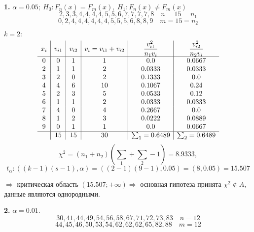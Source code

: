 \documentclass[9pt]{article}
\begin{document}
\ 
\par\textbf{1.} \(\alpha=0.05;\ H_0:F_n(x)=F_m(x),\ H_1:F_n(x)\neq F_m(x)\)
\[2,3,3,4,4,4,4,5,5,6,7,7,7,7,8\quad n=15=n_1\]
\[0,2,4,4,4,4,4,4,5,5,5,6,8,8,9\quad m=15=n_2\]
\par\(k=2:\)
\[\begin{array}{c|c|c|c|c|c}
    x_i & v_{i1} & v_{i2} & v_i=v_{i1}+v_{i2} & \dfrac{v_{i1}^2}{n_1v_i} & \dfrac{v_{i2}^2}{n_2v_i}\\
    \hline
    0 & 0 & 1 & 1 & 0.0 & 0.0667\\
    2 & 1 & 1 & 2 & 0.0333 & 0.0333\\
    3 & 2 & 0 & 2 & 0.1333 & 0.0 \\
    4 & 4 & 6 & 10 & 0.1067 & 0.24\\
    5 & 2 & 3 & 5 & 0.0533 & 0.12 \\
    6 & 1 & 1 & 2 & 0.0333 & 0.0333\\
    7 & 4 & 0 & 4 & 0.2667 & 0.0\\
    8 & 1 & 2 & 3 & 0.0222 & 0.0889\\
    9 & 0 & 1 & 1 & 0.0 & 0.0667 \\
    \hline
    & 15 & 15 & 30 &\sum_1=0.6489 & \sum_2=0.6489
\end{array}\]
\[\chi^2=(n_1+n_2)(\textstyle\sum_1+\sum_2-1)=8.9333,\]
\[t_\alpha: ((k-1)(s-1),\alpha)=((2-1)(9-1),0.05)=(8,0.05)=15.507\]
\par\(\Rightarrow\) критическая область \((15.507;+\infty)\Rightarrow\) основная гипотеза принята \(\chi^2\nin A\), данные являются однородными.
\par\textbf{2.} \(\alpha=0.01\).
\[30,41,44,49,54,56,58,67,71,72,73,83\quad n=12\]
\[44,45,46,50,53,54,62,62,62,65,82,88\quad m=12\]
\end{document}

